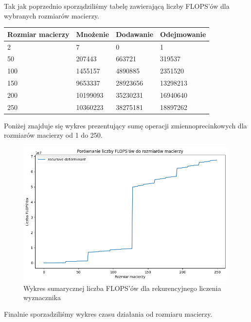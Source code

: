 \documentclass{article}
\begin{document}
Tak jak poprzednio sporządziliśmy tabelę zawierającą liczby FLOPS'ów dla wybranych rozmiarów macierzy.

\begin{table}[!ht]
    \centering
    \begin{tabular}{|l|l|l|l|}
    \hline
        Rozmiar macierzy & Mnożenie & Dodawanie & Odejmowanie  \\ \hline
        2 & 7 & 0 & 1  \\ \hline
        50 & 207443 & 663721 & 319537  \\ \hline
        100 & 1455157 & 4890885 & 2351520  \\ \hline
        150 & 9653337 & 28923656 & 13298213  \\ \hline
        200 & 10199093 & 35230231 & 16940640  \\ \hline
        250 & 10360223 & 38275181 & 18897262 \\ \hline
    \end{tabular}
\end{table}

\noindent
Poniżej znajduje się wykres prezentujący sumę operacji zmiennoprecinkowych
dla rozmiarów macierzy od 1 do 250.

\begin{figure}[H]
  \centering
    \includegraphics[width=0.99\textwidth]{images/determinant_flops.png}
  \caption{Wykres sumarycznej liczba FLOPS'ów dla rekurencyjnego liczenia wyznacznika}
\end{figure}

\noindent
Finalnie sporzadziliśmy wykres czasu działania od rozmiaru macierzy.
\end{document}
